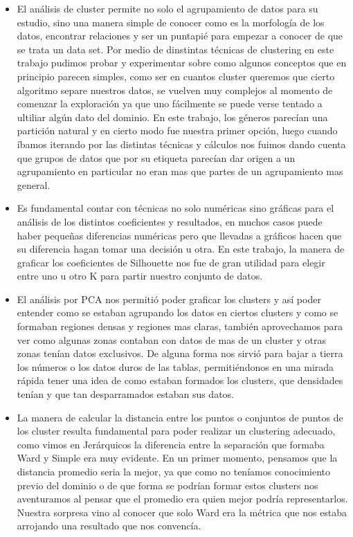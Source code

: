 
\begin{itemize} 

\item El análisis de cluster permite no solo el agrupamiento de datos para su estudio, sino una manera simple de conocer como es la morfología de los datos, encontrar relaciones y ser un puntapié para empezar a conocer de que se trata un data set. Por medio de dinstintas técnicas de clustering en este trabajo pudimos probar y experimentar sobre como algunos conceptos que en principio parecen simples, como ser en cuantos cluster queremos que cierto algoritmo separe nuestros datos, se vuelven muy complejos al momento de comenzar la exploración ya que uno fácilmente se puede verse tentado a ultiliar algún dato del dominio. En este trabajo, los géneros parecían una partición natural y en cierto modo fue nuestra primer opción, luego cuando íbamos iterando por las distintas técnicas y cálculos nos fuimos dando cuenta que grupos de datos que por su etiqueta parecían dar origen a un agrupamiento en particular no eran mas que partes de un agrupamiento mas general. 

\item Es fundamental contar con técnicas no solo numéricas sino gráficas para el análisis de los distintos coeficientes y resultados, en muchos casos puede haber pequeñas diferencias numéricas pero que llevadas a gráficos hacen que su diferencia hagan tomar una decisión u otra. En este trabajo, la manera de graficar los coeficientes de Silhouette nos fue de gran utilidad para elegir entre uno u otro K para partir nuestro conjunto de datos. 

\item El análisis por PCA nos permitió poder graficar los clusters y así poder entender como se estaban agrupando los datos en ciertos clusters y como se formaban regiones densas y regiones mas claras, también aprovechamos para ver como algunas zonas contaban con datos de mas de un cluster y otras zonas tenían datos exclusivos. De alguna forma nos sirvió para bajar a tierra los números o los datos duros de las tablas, permitiéndonos en una mirada rápida tener una idea de como estaban formados los clusters, que densidades tenían y que tan desparramados estaban sus datos. 

\item La manera de calcular la distancia entre los puntos o conjuntos de puntos de los cluster resulta fundamental para poder realizar un clustering adecuado, como vimos en Jerárquicos la diferencia entre la separación que formaba Ward y Simple era muy evidente. En un primer momento, pensamos que la distancia promedio seria la mejor, ya que como no teníamos conocimiento previo del dominio o de que forma se podrían formar estos clusters nos aventuramos al pensar que el promedio era quien mejor podría representarlos. Nuestra sorpresa vino al conocer que solo Ward era la métrica que nos estaba arrojando una resultado que nos convencía. 


\end{itemize}
